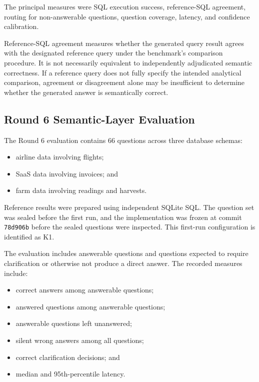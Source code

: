 \documentclass[conference]{IEEEtran}
\providecommand{\tightlist}{\setlength{\itemsep}{0pt}\setlength{\parskip}{0pt}}
\begin{document}
The principal measures were SQL execution success, reference-SQL agreement, routing for non-answerable questions, question coverage, latency, and confidence calibration.

Reference-SQL agreement measures whether the generated query result agrees with the designated reference query under the benchmark's comparison procedure. It is not necessarily equivalent to independently adjudicated semantic correctness. If a reference query does not fully specify the intended analytical comparison, agreement or disagreement alone may be insufficient to determine whether the generated answer is semantically correct.

\subsection{Round 6 Semantic-Layer Evaluation}

The Round 6 evaluation contains 66 questions across three database schemas:

\begin{itemize}
\tightlist
\item
  airline data involving flights;
\item
  SaaS data involving invoices; and
\item
  farm data involving readings and harvests.
\end{itemize}

Reference results were prepared using independent SQLite SQL. The question set was sealed before the first run, and the implementation was frozen at commit \texttt{78d906b} before the sealed questions were inspected. This first-run configuration is identified as K1.

The evaluation includes answerable questions and questions expected to require clarification or otherwise not produce a direct answer. The recorded measures include:

\begin{itemize}
\tightlist
\item
  correct answers among answerable questions;
\item
  answered questions among answerable questions;
\item
  answerable questions left unanswered;
\item
  silent wrong answers among all questions;
\item
  correct clarification decisions; and
\item
  median and 95th-percentile latency.
\end{itemize}
\end{document}
